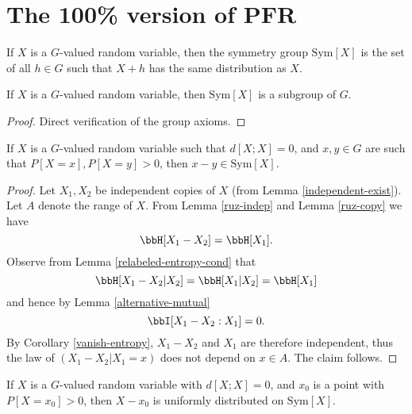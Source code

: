\chapter{The 100\% version of PFR}

\begin{definition}\label{sym-group-def}
\leanok
If $X$ is a $G$-valued random variable, then the symmetry group $\mathrm{Sym}[X]$ is the set of all $h \in G$ such that $X+h$ has the same distribution as $X$.
\end{definition}

\begin{lemma}\label{sym-group}
\leanok
If $X$ is a $G$-valued random variable, then $\mathrm{Sym}[X]$ is a subgroup of $G$.
\end{lemma}

\begin{proof}\leanok Direct verification of the group axioms.
\end{proof}

\begin{lemma}\label{zero-large}
  \leanok  If $X$ is a $G$-valued random variable such that
  $d[X;X]=0$, and $x,y \in G$ are such that $P[X=x], P[X=y]>0$, then $x-y \in \mathrm{Sym}[X]$.
\end{lemma}

\begin{proof}
  \leanok
   Let $X_1,X_2$ be independent copies of $X$ (from Lemma \ref{independent-exist}). Let $A$ denote the range of $X$.  From Lemma \ref{ruz-indep} and Lemma \ref{ruz-copy} we have
  $$ \bbH[X_1-X_2] = \bbH[X_1].$$
Observe from Lemma \ref{relabeled-entropy-cond} that
$$ \bbH[X_1-X_2|X_2] = \bbH[X_1|X_2] = \bbH[X_1]$$
and hence by Lemma \ref{alternative-mutual}
$$ \bbI[ X_1-X_2 : X_1 ] = 0.$$
By Corollary \ref{vanish-entropy}, $X_1-X_2$ and $X_1$ are therefore independent, thus the law of $(X_1-X_2|X_1=x)$ does not depend on $x \in A$. The claim follows.
\end{proof}

\begin{lemma}\label{sym-zero}
\leanok
  If $X$ is a $G$-valued random variable with $d[X;X]=0$, and $x_0$ is a point with $P[X=x_0] > 0$, then $X-x_0$ is uniformly distributed on $\mathrm{Sym}[X]$.
\end{lemma}

